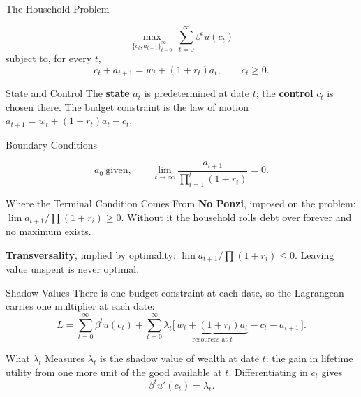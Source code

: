 \documentclass[11pt,aspectratio=169,c]{beamer}
\begin{document}
\begin{frame}{The Household Problem}
  \begin{definitionbox}[Given $\{w_t,r_t\}_{t=0}^{\infty}$ and $a_0$]
    \[
      \max_{\{c_t,a_{t+1}\}_{t=0}^{\infty}}\ \sum_{t=0}^{\infty}\beta^t u(c_t)
    \]
    subject to, for every $t$,
    \[
      c_t+a_{t+1}=w_t+(1+r_t)a_t,
      \qquad
      c_t\geq0 .
    \]
  \end{definitionbox}

  \begin{block}{State and Control}
    The \textbf{state} $a_t$ is predetermined at date $t$; the \textbf{control}
    $c_t$ is chosen there. The budget constraint is the law of motion
    $a_{t+1}=w_t+(1+r_t)a_t-c_t$.
  \end{block}
\end{frame}

\begin{frame}{Boundary Conditions}
  \begin{definitionbox}
    \[
      a_0\ \text{given},
      \qquad
      \lim_{t\to\infty}\frac{a_{t+1}}{\prod_{i=1}^{t}(1+r_i)}=0 .
    \]
  \end{definitionbox}

  \begin{block}{Where the Terminal Condition Comes From}
    \textbf{No Ponzi}, imposed on the problem:
    $\lim a_{t+1}/\prod(1+r_i)\geq0$. Without it the household rolls debt over
    forever and no maximum exists.\par\smallskip
    \textbf{Transversality}, implied by optimality:
    $\lim a_{t+1}/\prod(1+r_i)\leq0$. Leaving value unspent is never optimal.
  \end{block}
\end{frame}

\begin{frame}{Shadow Values}
  There is one budget constraint at each date, so the Lagrangean carries one
  multiplier at each date:
  \[
    L=\sum_{t=0}^{\infty}\beta^t u(c_t)
     +\sum_{t=0}^{\infty}\lambda_t
      \bigl[\,\underbrace{w_t+(1+r_t)a_t}_{\text{resources at }t}
      -c_t-a_{t+1}\,\bigr].
  \]

  \begin{block}{What $\lambda_t$ Measures}
    $\lambda_t$ is the shadow value of wealth at date $t$: the gain in lifetime
    utility from one more unit of the good available at $t$. Differentiating in
    $c_t$ gives
    \[
      \beta^t u'(c_t)=\lambda_t .
    \]
  \end{block}
\end{frame}
\end{document}
